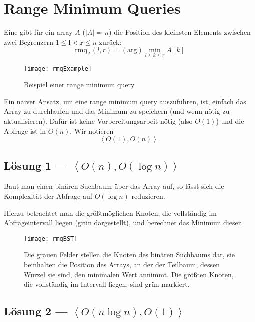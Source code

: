 \chapter{Range Minimum Queries}

Eine  gibt für ein array \( A \) (\( \left\vert A \right\vert \eqqcolon n \)) die Position des kleinsten Elements zwischen zwei Begrenzern \( 1 \leq \bm{l} < \bm{r} \leq n \) zurück:
\begin{equation*}
  \text{rmq}_A(l,r) = (\text{arg})\min_{l \leq k \leq r}A[k]
\end{equation*}

\begin{figure}[H]
  \texttt{[image: rmqExample]}
  \caption{Beispiel einer range minimum query}
\end{figure}

Ein naiver Ansatz, um eine range minimum query auszuführen, ist, einfach das Array zu durchlaufen und das Minimum zu speichern (und wenn nötig zu aktualisieren). Dafür ist keine Vorbereitungsarbeit nötig (also \( O(1) \)) und die Abfrage ist in \( O(n) \). Wir notieren
\begin{equation*}
  \left\langle O(1), O(n) \right\rangle\text{.}
\end{equation*}

\section{Lösung 1 --- \( \left\langle O(n), O(\log n) \right\rangle \)}

Baut man einen binären Suchbaum über das Array auf, so lässt sich die Komplexität der Abfrage auf \( O(\log n) \) reduzieren.

Hierzu betrachtet man die größtmöglichen Knoten, die vollständig im Abfrageintervall liegen (grün dargestellt), und berechnet das Minimum dieser.

\begin{figure}[H]
  \texttt{[image: rmqBST]}
  \caption{Die grauen Felder stellen die Knoten des binären Suchbaums dar, sie beinhalten die Position des Arrays, an der der Teilbaum, dessen Wurzel sie sind, den minimalen Wert annimmt. Die größten Knoten, die vollständig im Intervall liegen, sind grün markiert.}
\end{figure}

\section{Lösung 2 --- \( \left\langle O(n\log n),O(1) \right\rangle \)}

